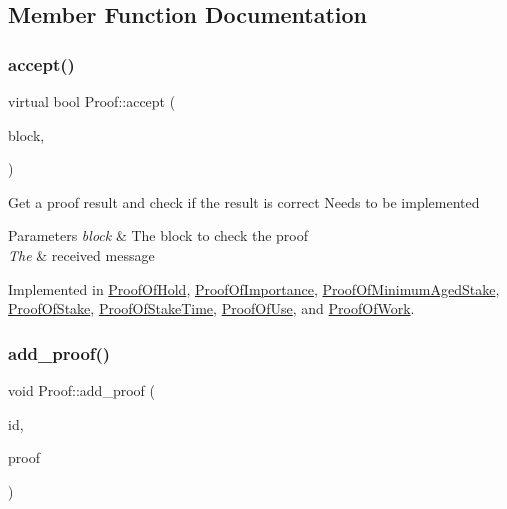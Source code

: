 \subsection{Member Function Documentation}
\mbox{\label{classProof_ad52fee058ea617a186133cb6a008fe6e}} 
\subsubsection{\texorpdfstring{accept()}{accept()}}
{\footnotesize\ttfamily virtual bool Proof\+::accept (\begin{DoxyParamCaption}\item[{\mbox{\hyperlink{classBlock}{Block}} $\ast$}]{block,  }\item[{\mbox{\hyperlink{classMessage}{Message}} $\ast$}]{ }\end{DoxyParamCaption})\hspace{0.3cm}{\ttfamily [pure virtual]}}

Get a proof result and check if the result is correct Needs to be implemented


\begin{DoxyParams}{Parameters}
{\em block} & The block to check the proof \\
\hline
{\em The} & received message \\
\hline
\end{DoxyParams}


Implemented in \mbox{\hyperlink{classProofOfHold_a2ca4ea3c1791c24d75e466ed0a9b6aaa}{Proof\+Of\+Hold}}, \mbox{\hyperlink{classProofOfImportance_ab40da85ecfe7b87f21c63641d255f94e}{Proof\+Of\+Importance}}, \mbox{\hyperlink{classProofOfMinimumAgedStake_add68213606b37c50390cf1a0dd16c17b}{Proof\+Of\+Minimum\+Aged\+Stake}}, \mbox{\hyperlink{classProofOfStake_a7c5939106f9dcb8bc9612a5974a43c88}{Proof\+Of\+Stake}}, \mbox{\hyperlink{classProofOfStakeTime_a7a681ba9510b3b11cd2269a69e64a66c}{Proof\+Of\+Stake\+Time}}, \mbox{\hyperlink{classProofOfUse_aad52f30c49109a8714181de0aaab8789}{Proof\+Of\+Use}}, and \mbox{\hyperlink{classProofOfWork_abe3dba92dad383eec07f70acccaa802d}{Proof\+Of\+Work}}.

\mbox{\label{classProof_a71874539fdbcc93c15594b889c95225b}} 
\subsubsection{\texorpdfstring{add\+\_\+proof()}{add\_proof()}}
{\footnotesize\ttfamily void Proof\+::add\+\_\+proof (\begin{DoxyParamCaption}\item[{int}]{id,  }\item[{std\+::function$<$ \mbox{\hyperlink{classProof}{Proof}} $\ast$()$>$}]{proof }\end{DoxyParamCaption})\hspace{0.3cm}{\ttfamily [static]}}

